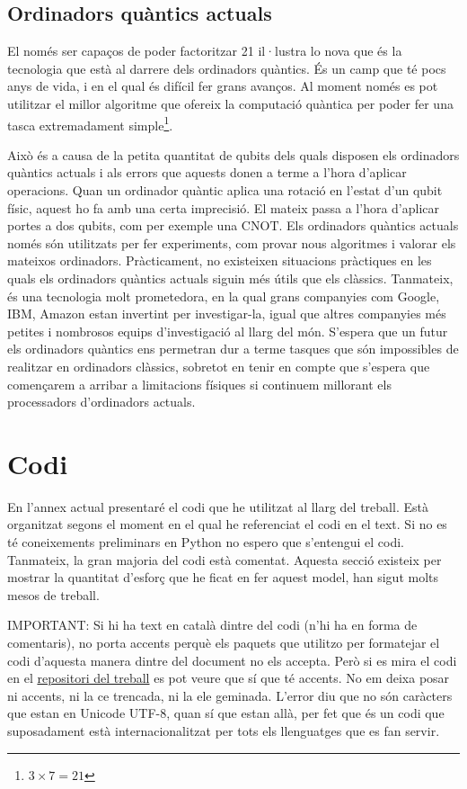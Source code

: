 \section{Ordinadors quàntics actuals}
El només ser capaços de poder factoritzar 21 il·lustra lo nova que és la tecnologia que està al darrere dels ordinadors quàntics. És un camp que té pocs anys de vida, i en el qual és difícil fer grans avanços. Al moment només es pot utilitzar el millor algoritme que ofereix la computació quàntica per poder fer una tasca extremadament simple\footnote{$3 \times 7 = 21$}.

Això és a causa de la petita quantitat de qubits dels quals disposen els ordinadors quàntics actuals i als errors que aquests donen a terme a l'hora d'aplicar operacions. Quan un ordinador quàntic aplica una rotació en l'estat d'un qubit físic, aquest ho fa amb una certa imprecisió. El mateix passa a l'hora d'aplicar portes a dos qubits, com per exemple una $\mathrm{CNOT}$. Els ordinadors quàntics actuals només són utilitzats per fer experiments, com provar nous algoritmes i valorar els mateixos ordinadors. Pràcticament, no existeixen situacions pràctiques en les quals els ordinadors quàntics actuals siguin més útils que els clàssics. Tanmateix, és una tecnologia molt prometedora, en la qual grans companyies com Google, IBM, Amazon estan invertint per investigar-la, igual que altres companyies més petites i nombrosos equips d'investigació al llarg del món. S'espera que un futur els ordinadors quàntics ens permetran dur a terme tasques que són impossibles de realitzar en ordinadors clàssics, sobretot en tenir en compte que s'espera que començarem a arribar a limitacions físiques si continuem millorant els processadors d'ordinadors actuals.


\chapter{Codi}
En l'annex actual presentaré el codi que he utilitzat al llarg del treball. Està organitzat segons el moment en el qual he referenciat el codi en el text. Si no es té coneixements preliminars en Python no espero que s'entengui el codi. Tanmateix, la gran majoria del codi està comentat. Aquesta secció existeix per mostrar la quantitat d'esforç que he ficat en fer aquest model, han sigut molts mesos de treball.

IMPORTANT: Si hi ha text en català dintre del codi (n'hi ha en forma de comentaris), no porta accents perquè els paquets que utilitzo per formatejar el codi d'aquesta manera dintre del document no els accepta. Però si es mira el codi en el \href{https://github.com/tomiock/qGAN}{repositori del treball} es pot veure que sí que té accents. No em deixa posar ni accents, ni la ce trencada, ni la ele geminada. L'error diu que no són caràcters que estan en Unicode UTF-8, quan sí que estan allà, per fet que és un codi que suposadament està internacionalitzat per tots els llenguatges que es fan servir.

